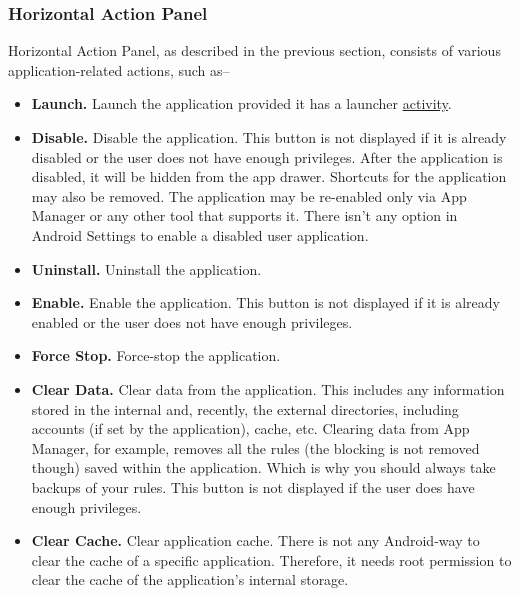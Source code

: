 \subsubsection{Horizontal Action Panel}\label{subsubsec:horizontal-action-panel} %
Horizontal Action Panel, as described in the previous section, consists of various application-related actions, such as--
\begin{itemize}
    \item \textbf{Launch.} Launch the application provided it has a launcher \hyperref[subsubsec:activities]{activity}.

    \item \textbf{Disable.} Disable the application. This button is not displayed if it is already disabled or the user
    does not have enough privileges. After the application is disabled, it will be hidden from the app drawer. Shortcuts
    for the application may also be removed. The application may be re-enabled only via App Manager or any other tool
    that supports it. There isn't any option in Android Settings to enable a disabled user application.

    \item \textbf{Uninstall.} Uninstall the application.

    \item \textbf{Enable.} Enable the application. This button is not displayed if it is already enabled or the user
    does not have enough privileges.

    \item \textbf{Force Stop.} Force-stop the application.

    \item \textbf{Clear Data.} Clear data from the application. This includes any information stored in the internal
    and, recently, the external directories, including accounts (if set by the application), cache, etc. Clearing data
    from App Manager, for example, removes all the rules (the blocking is not removed though) saved within the
    application. Which is why you should always take backups of your rules. This button is not displayed if the user
    does have enough privileges.

    \item \textbf{Clear Cache.} Clear application cache. There is not any Android-way to clear the cache of a specific
    application. Therefore, it needs root permission to clear the cache of the application's internal storage.


\end{itemize}
